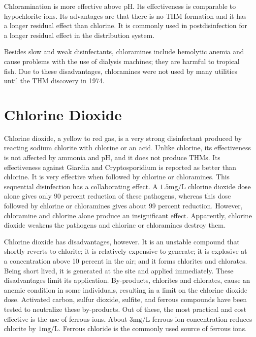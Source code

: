 \documentclass[10pt]{article}
\begin{document}
Chloramination is more effective above $\mathrm{pH}$. Its effectiveness is comparable to hypochlorite ions. Its advantages are that there is no THM formation and it has a longer residual effect than chlorine. It is commonly used in postdisinfection for a longer residual effect in the distribution system.

Besides slow and weak disinfectants, chloramines include hemolytic anemia and cause problems with the use of dialysis machines; they are harmful to tropical fish. Due to these disadvantages, chloramines were not used by many utilities until the THM discovery in 1974.

\section{Chlorine Dioxide}
Chlorine dioxide, a yellow to red gas, is a very strong disinfectant produced by reacting sodium chlorite with chlorine or an acid. Unlike chlorine, its effectiveness is not affected by ammonia and $\mathrm{pH}$, and it does not produce THMs. Its effectiveness against Giardia and Cryptosporidium is reported as better than chlorine. It is very effective when followed by chlorine or chloramines. This sequential disinfection has a collaborating effect. A $1.5 \mathrm{mg} / \mathrm{L}$ chlorine dioxide dose alone gives only 90 percent reduction of these pathogens, whereas this dose followed by chlorine or chloramines gives about 99 percent reduction. However, chloramine and chlorine alone produce an insignificant effect. Apparently, chlorine dioxide weakens the pathogens and chlorine or chloramines destroy them.

Chlorine dioxide has disadvantages, however. It is an unstable compound that shortly reverts to chlorite; it is relatively expensive to generate; it is explosive at a concentration above 10 percent in the air; and it forms chlorites and chlorates. Being short lived, it is generated at the site and applied immediately. These disadvantages limit its application. By-products, chlorites and chlorates, cause an anemic condition in some individuals, resulting in a limit on the chlorine dioxide dose. Activated carbon, sulfur dioxide, sulfite, and ferrous compounds have been tested to neutralize these by-products. Out of these, the most practical and cost effective is the use of ferrous ions. About $3 \mathrm{mg} / \mathrm{L}$ ferrous ion concentration reduces chlorite by $1 \mathrm{mg} / \mathrm{L}$. Ferrous chloride is the commonly used source of ferrous ions.
\end{document}
